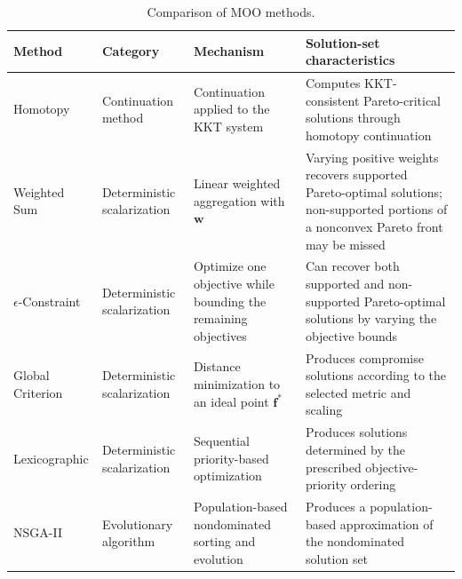 \documentclass[11pt,pdflatex,sn-mathphys-ay]{sn-jnl}%
\theoremstyle{definition}
\theoremstyle{thmstyleone}%
\theoremstyle{thmstyletwo}%
\theoremstyle{thmstylethree}%
\begin{document}
	
	\begin{table}[htbp]
		\centering
		\caption{Comparison of MOO methods.}
		\label{tab:comparison_methods}
		\renewcommand{\arraystretch}{1.2}
		
		\begin{tabular}{p{2.2cm} p{2cm} p{4.8cm} p{4.4cm}}
			\hline
			\textbf{Method}
			& \textbf{Category}
			& \textbf{Mechanism}
			& \textbf{Solution-set characteristics} \\
			\hline
			
			Homotopy
			& Continuation method
			& Continuation applied to the KKT system
			& Computes KKT-consistent Pareto-critical solutions through homotopy
			continuation \\
			\hline
			
			Weighted Sum
			& Deterministic scalarization
			& Linear weighted aggregation with $\mathbf{w}$
			& Varying positive weights recovers supported Pareto-optimal solutions;
			non-supported portions of a nonconvex Pareto front may be missed \\
			\hline
			
			$\epsilon$-Constraint
			& Deterministic scalarization
			& Optimize one objective while bounding the remaining objectives
			& Can recover both supported and non-supported Pareto-optimal solutions
			by varying the objective bounds \\
			\hline
			
			Global Criterion
			& Deterministic scalarization
			& Distance minimization to an ideal point $\bm{f}^{\ast}$
			& Produces compromise solutions according to the selected metric and
			scaling \\
			\hline
			
			Lexicographic
			& Deterministic scalarization
			& Sequential priority-based optimization
			& Produces solutions determined by the prescribed objective-priority
			ordering \\
			\hline
			
			NSGA-II
			& Evolutionary algorithm
			& Population-based nondominated sorting and evolution
			& Produces a population-based approximation of the
			nondominated solution set \\
			\hline
		\end{tabular}
	\end{table}
	
\end{document}
